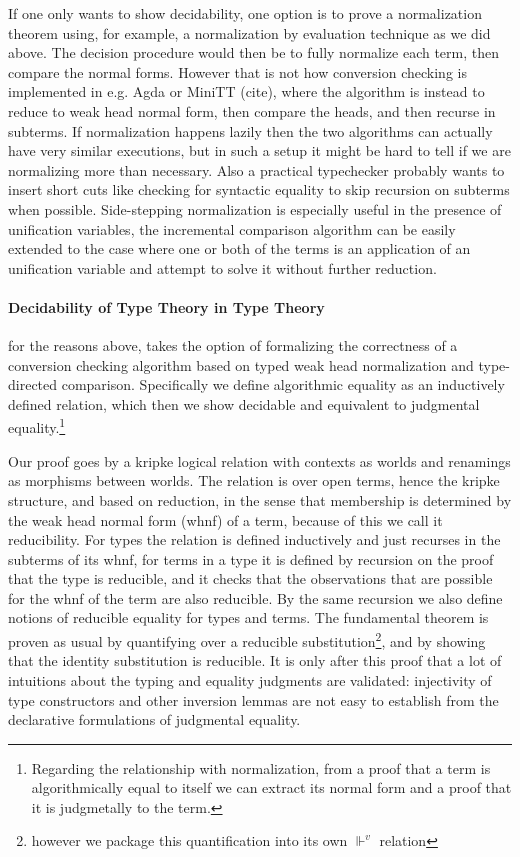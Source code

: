 \documentclass{book}
\begin{document}
If one only wants to show decidability, one option is to prove a
normalization theorem using, for example, a normalization by
evaluation technique as we did above. The decision procedure would
then be to fully normalize each term, then compare the normal forms.
However that is not how conversion checking is implemented in
e.g. Agda or MiniTT (cite), where the algorithm is instead to reduce
to weak head normal form, then compare the heads, and then recurse in
subterms. If normalization happens lazily then the two algorithms can
actually have very similar executions, but in such a setup it might be
hard to tell if we are normalizing more than necessary. Also a
practical typechecker probably wants to insert short cuts like
checking for syntactic equality to skip recursion on subterms when
possible. Side-stepping normalization is especially useful in the
presence of unification variables, the incremental comparison
algorithm can be easily extended to the case where one or both of the
terms is an application of an unification variable and attempt to
solve it without further reduction.


\paragraph{Decidability of Type Theory in Type Theory} for the reasons above,
takes the option of formalizing the correctness of a conversion
checking algorithm based on typed weak head normalization and
type-directed comparison. Specifically we define algorithmic equality
as an inductively defined relation, which then we show decidable and
equivalent to judgmental equality.\footnote{Regarding the relationship with
normalization, from a proof that a term is algorithmically equal to
itself we can extract its normal form and a
proof that it is judgmetally to the term.}

Our proof goes by a kripke logical relation with contexts as worlds
and renamings as morphisms between worlds. The relation is over open
terms, hence the kripke structure, and based on reduction, in the
sense that membership is determined by the weak head normal form
(whnf) of a term, because of this we call it reducibility. For types
the relation is defined inductively and just recurses in the subterms
of its whnf, for terms in a type it is defined by recursion on the
proof that the type is reducible, and it checks that the observations
that are possible for the whnf of the term are also reducible. By the
same recursion we also define notions of reducible equality for types
and terms. The fundamental theorem is proven as usual by quantifying
over a reducible substitution\footnote{however we package this
  quantification into its own $\Vdash^v$ relation}, and by showing
that the identity substitution is reducible. It is only after this
proof that a lot of intuitions about the typing and equality judgments
are validated: injectivity of type constructors and other inversion
lemmas are not easy to establish from the declarative formulations of
judgmental equality.
\end{document}
